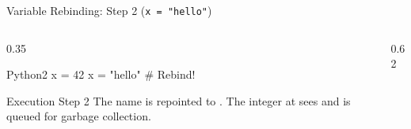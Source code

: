 \begin{frame}[fragile]{Variable Rebinding: Step 2 (\texttt{x = "hello"})}
  \begin{columns}[T,onlytextwidth]
    \begin{column}{0.35\textwidth}
      \begin{HighlightedCodeBlock}{Python}{2}
x = 42
x = "hello"  # Rebind!
      \end{HighlightedCodeBlock}
      \vspace{0.12cm}
      \begin{ConceptBox}{Execution Step 2}
        \scriptsize The name  is repointed to . The integer at  sees  and is queued for garbage collection.
      \end{ConceptBox}
    \end{column}
    \begin{column}{0.62\textwidth}
      \centering
    \end{column}
  \end{columns}
  \vspace{0.15cm}
\end{frame}

